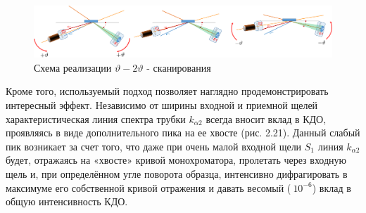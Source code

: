  \begin{figure}[H]
   \centering
   \includegraphics[width=1\textwidth]{images/theta_2theta_scan.png}
   \caption{Схема реализации $\vartheta - 2\vartheta$ - сканирования}
   \label{ris:theta_2theta_scan}
 \end{figure}
Кроме того, используемый подход позволяет наглядно продемонстрировать интересный эффект.
 Независимо от ширины входной и приемной щелей характеристическая линия спектра
 трубки $k_{\alpha 2}$ всегда вносит вклад в КДО, проявляясь в виде дополнительного
 пика на ее хвосте (рис. 2.21). Данный слабый пик возникает за счет того, что
 даже при очень малой входной щели $S_1$ линия $k_{\alpha 2}$ будет, отражаясь на «хвосте»
 кривой монохроматора, пролетать через входную щель и, при определённом угле
 поворота образца, интенсивно дифрагировать в максимуме его собственной кривой
 отражения и давать весомый ($~10^{-6}$) вклад в общую интенсивность КДО.
